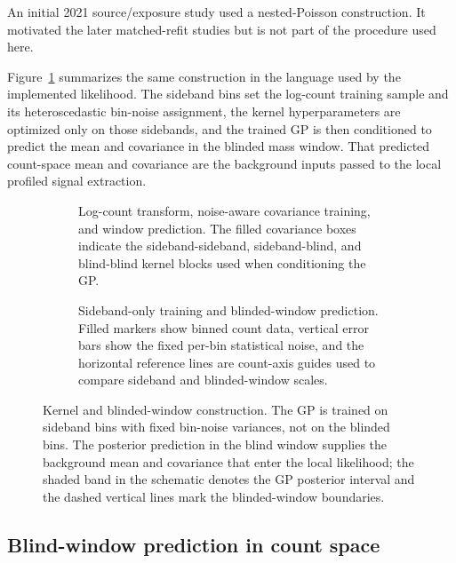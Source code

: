 An initial 2021 source/exposure study used a nested-Poisson construction. It motivated
the later matched-refit studies but is not part of the procedure used here.

Figure~\ref{fig:gpr-window-construction} summarizes the same construction in the
language used by the implemented likelihood. The sideband bins set the log-count
training sample and its heteroscedastic bin-noise assignment, the kernel hyperparameters
are optimized only on those sidebands, and the trained GP is then conditioned to predict
the mean and covariance in the blinded mass window. That predicted count-space mean and
covariance are the background inputs passed to the local profiled signal extraction.

\begin{figure}[H]
\centering
\begin{subfigure}[t]{0.52\linewidth}
  \centering
  \caption{Log-count transform, noise-aware covariance training, and window prediction.
  The filled covariance boxes indicate the sideband-sideband, sideband-blind, and
  blind-blind kernel blocks used when conditioning the GP.}
\end{subfigure}
\hfill
\begin{subfigure}[t]{0.45\linewidth}
  \centering
  \caption{Sideband-only training and blinded-window prediction. Filled markers show
  binned count data, vertical error bars show the fixed per-bin statistical noise, and
  the horizontal reference lines are count-axis guides used to compare sideband and
  blinded-window scales.}
\end{subfigure}
\caption{Kernel and blinded-window construction. The GP is
trained on sideband bins with fixed bin-noise variances, not on the blinded bins. The
posterior prediction in the blind window supplies the background mean and covariance
that enter the local likelihood; the shaded band in the schematic denotes the GP
posterior interval and the dashed vertical lines mark the blinded-window boundaries.}
\label{fig:gpr-window-construction}
\end{figure}

\subsection{Blind-window prediction in count space}
\label{sec:blind-window-prediction}


